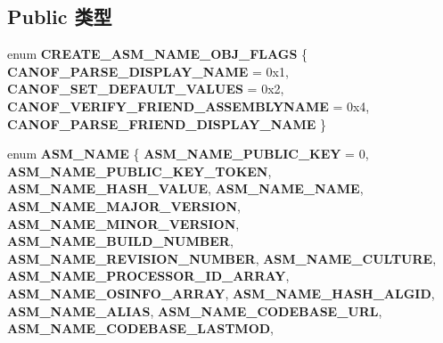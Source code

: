 \subsection*{Public 类型}
\begin{DoxyCompactItemize}
\item 
\mbox{\label{interface_i_assembly_name_af922556ef7c502498db3d8e525dba0dd}} 
enum {\bfseries C\+R\+E\+A\+T\+E\+\_\+\+A\+S\+M\+\_\+\+N\+A\+M\+E\+\_\+\+O\+B\+J\+\_\+\+F\+L\+A\+GS} \{ {\bfseries C\+A\+N\+O\+F\+\_\+\+P\+A\+R\+S\+E\+\_\+\+D\+I\+S\+P\+L\+A\+Y\+\_\+\+N\+A\+ME} = 0x1, 
{\bfseries C\+A\+N\+O\+F\+\_\+\+S\+E\+T\+\_\+\+D\+E\+F\+A\+U\+L\+T\+\_\+\+V\+A\+L\+U\+ES} = 0x2, 
{\bfseries C\+A\+N\+O\+F\+\_\+\+V\+E\+R\+I\+F\+Y\+\_\+\+F\+R\+I\+E\+N\+D\+\_\+\+A\+S\+S\+E\+M\+B\+L\+Y\+N\+A\+ME} = 0x4, 
{\bfseries C\+A\+N\+O\+F\+\_\+\+P\+A\+R\+S\+E\+\_\+\+F\+R\+I\+E\+N\+D\+\_\+\+D\+I\+S\+P\+L\+A\+Y\+\_\+\+N\+A\+ME}
 \}
\item 
\mbox{\label{interface_i_assembly_name_a1de6fa265ce040da4a93f6afab40db64}} 
enum {\bfseries A\+S\+M\+\_\+\+N\+A\+ME} \{ \newline
{\bfseries A\+S\+M\+\_\+\+N\+A\+M\+E\+\_\+\+P\+U\+B\+L\+I\+C\+\_\+\+K\+EY} = 0, 
{\bfseries A\+S\+M\+\_\+\+N\+A\+M\+E\+\_\+\+P\+U\+B\+L\+I\+C\+\_\+\+K\+E\+Y\+\_\+\+T\+O\+K\+EN}, 
{\bfseries A\+S\+M\+\_\+\+N\+A\+M\+E\+\_\+\+H\+A\+S\+H\+\_\+\+V\+A\+L\+UE}, 
{\bfseries A\+S\+M\+\_\+\+N\+A\+M\+E\+\_\+\+N\+A\+ME}, 
\newline
{\bfseries A\+S\+M\+\_\+\+N\+A\+M\+E\+\_\+\+M\+A\+J\+O\+R\+\_\+\+V\+E\+R\+S\+I\+ON}, 
{\bfseries A\+S\+M\+\_\+\+N\+A\+M\+E\+\_\+\+M\+I\+N\+O\+R\+\_\+\+V\+E\+R\+S\+I\+ON}, 
{\bfseries A\+S\+M\+\_\+\+N\+A\+M\+E\+\_\+\+B\+U\+I\+L\+D\+\_\+\+N\+U\+M\+B\+ER}, 
{\bfseries A\+S\+M\+\_\+\+N\+A\+M\+E\+\_\+\+R\+E\+V\+I\+S\+I\+O\+N\+\_\+\+N\+U\+M\+B\+ER}, 
\newline
{\bfseries A\+S\+M\+\_\+\+N\+A\+M\+E\+\_\+\+C\+U\+L\+T\+U\+RE}, 
{\bfseries A\+S\+M\+\_\+\+N\+A\+M\+E\+\_\+\+P\+R\+O\+C\+E\+S\+S\+O\+R\+\_\+\+I\+D\+\_\+\+A\+R\+R\+AY}, 
{\bfseries A\+S\+M\+\_\+\+N\+A\+M\+E\+\_\+\+O\+S\+I\+N\+F\+O\+\_\+\+A\+R\+R\+AY}, 
{\bfseries A\+S\+M\+\_\+\+N\+A\+M\+E\+\_\+\+H\+A\+S\+H\+\_\+\+A\+L\+G\+ID}, 
\newline
{\bfseries A\+S\+M\+\_\+\+N\+A\+M\+E\+\_\+\+A\+L\+I\+AS}, 
{\bfseries A\+S\+M\+\_\+\+N\+A\+M\+E\+\_\+\+C\+O\+D\+E\+B\+A\+S\+E\+\_\+\+U\+RL}, 
{\bfseries A\+S\+M\+\_\+\+N\+A\+M\+E\+\_\+\+C\+O\+D\+E\+B\+A\+S\+E\+\_\+\+L\+A\+S\+T\+M\+OD}, 

\end{DoxyCompactItemize}
